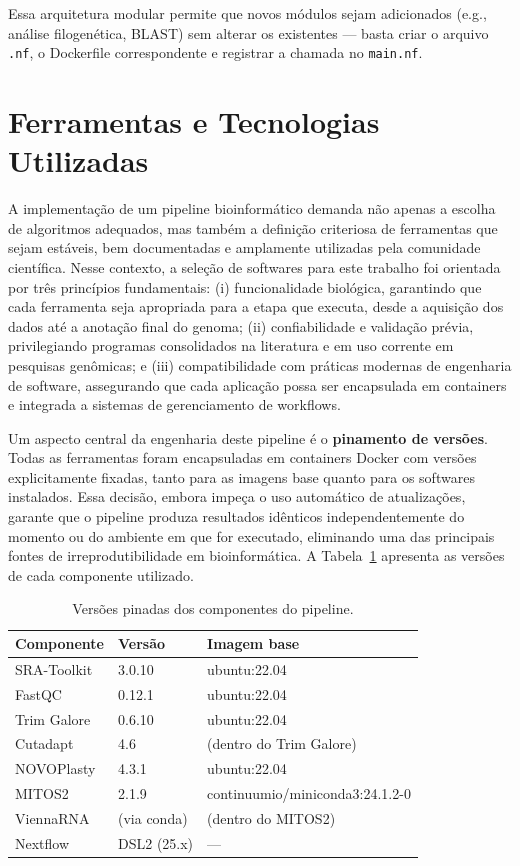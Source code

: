 Essa arquitetura modular permite que novos módulos sejam adicionados (e.g., análise filogenética, BLAST) sem alterar os existentes --- basta criar o arquivo \texttt{.nf}, o Dockerfile correspondente e registrar a chamada no \texttt{main.nf}.

\section{Ferramentas e Tecnologias Utilizadas}

A implementação de um pipeline bioinformático demanda não apenas a escolha de algoritmos adequados, mas também a definição criteriosa de ferramentas que sejam estáveis, bem documentadas e amplamente utilizadas pela comunidade científica. Nesse contexto, a seleção de softwares para este trabalho foi orientada por três princípios fundamentais: (i) funcionalidade biológica, garantindo que cada ferramenta seja apropriada para a etapa que executa, desde a aquisição dos dados até a anotação final do genoma; (ii) confiabilidade e validação prévia, privilegiando programas consolidados na literatura e em uso corrente em pesquisas genômicas; e (iii) compatibilidade com práticas modernas de engenharia de software, assegurando que cada aplicação possa ser encapsulada em containers e integrada a sistemas de gerenciamento de workflows.

Um aspecto central da engenharia deste pipeline é o \textbf{pinamento de versões}. Todas as ferramentas foram encapsuladas em containers Docker com versões explicitamente fixadas, tanto para as imagens base quanto para os softwares instalados. Essa decisão, embora impeça o uso automático de atualizações, garante que o pipeline produza resultados idênticos independentemente do momento ou do ambiente em que for executado, eliminando uma das principais fontes de irreprodutibilidade em bioinformática. A Tabela~\ref{tab:versoes} apresenta as versões de cada componente utilizado.

\begin{table}[H]
\centering
\caption{Versões pinadas dos componentes do pipeline.}
\label{tab:versoes}
\begin{tabular}{@{}lll@{}}
\toprule
\textbf{Componente} & \textbf{Versão} & \textbf{Imagem base} \\
\midrule
SRA-Toolkit & 3.0.10 & ubuntu:22.04 \\
FastQC & 0.12.1 & ubuntu:22.04 \\
Trim Galore & 0.6.10 & ubuntu:22.04 \\
Cutadapt & 4.6 & (dentro do Trim Galore) \\
NOVOPlasty & 4.3.1 & ubuntu:22.04 \\
MITOS2 & 2.1.9 & continuumio/miniconda3:24.1.2-0 \\
ViennaRNA & (via conda) & (dentro do MITOS2) \\
Nextflow & DSL2 (25.x) & --- \\
\bottomrule
\end{tabular}
\end{table}

